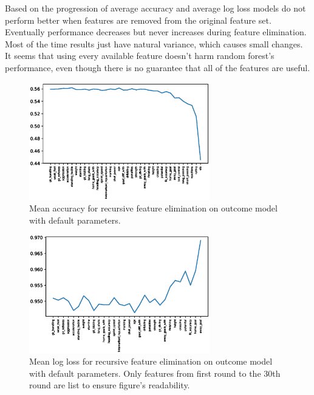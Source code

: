Based on the progression of average accuracy and average log loss models do not perform better when features are removed from the original feature set. Eventually performance decreases but never increases during feature elimination. Most of the time results just have natural variance, which causes small changes. It seems that using every available feature doesn't harm random forest's performance, even though there is no guarantee that all of the features are useful.
\begin{figure}[H]
    \centering
    \includegraphics[width=0.7\textwidth]{img/default_avg_accuracy.eps}
    \caption{Mean accuracy for recursive feature elimination on outcome model with default parameters.}
    \label{fig:def_avg_accu}
\end{figure}

\begin{figure}[H]
    \centering
    \includegraphics[width=0.7\textwidth]{img/default_avg_lloss.eps}
    \caption{Mean log loss for recursive feature elimination on outcome model with default parameters. Only features from first round to the 30th round are list to ensure figure's readability.}
    \label{fig:def_avg_loss}
\end{figure}


